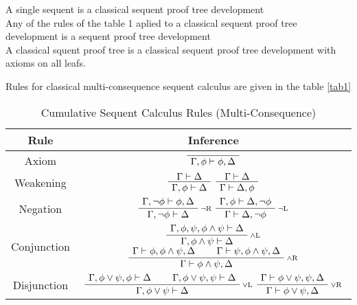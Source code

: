 \documentclass[runningheads]{llncs}
\begin{document}
\begin {definition}
    A single sequent is a classical sequent proof tree development\\
    Any of the rules of the table 1 aplied to a classical sequent proof tree development is a sequent proof tree development\\
    A classical squent proof tree is a classical sequent proof tree development with axioms on all leafs.
\end {definition} 

Rules for classical multi-consequence sequent calculus are given in the table \ref{tab1}

\begin{table}[h!]
    \caption{Cumulative Sequent Calculus Rules (Multi-Consequence)}\label{tab:cumulative}
    \centering
    \renewcommand{\arraystretch}{3}
    \begin{tabular}{|c|c|}
        \hline
        \textbf{Rule} & \textbf{Inference} \\ \hline
        Axiom & $\AxiomC{}\UnaryInfC{$\Gamma, \phi \vdash \phi, \Delta$}\DisplayProof$ \\ \hline
        
        Weakening & 
        $\AxiomC{$\Gamma \vdash \Delta$}\UnaryInfC{$\Gamma, \phi \vdash \Delta$}\DisplayProof$ \quad
        $\AxiomC{$\Gamma \vdash \Delta$}\UnaryInfC{$\Gamma \vdash \Delta, \phi$}\DisplayProof$ \\ \hline
        
        Negation & 
        $\RightLabel{\scriptsize{$\neg$R}}\AxiomC{$\Gamma , \neg \phi \vdash \phi, \Delta$}\UnaryInfC{$\Gamma, \neg \phi \vdash \Delta$}\DisplayProof$ \quad
        $\RightLabel{\scriptsize{$\neg$L}}\AxiomC{$\Gamma, \phi \vdash \Delta, \neg \phi $}\UnaryInfC{$\Gamma \vdash  \Delta, \neg \phi $}\DisplayProof$ \\ \hline
        
        Conjunction & 
        $\RightLabel{\scriptsize{$\land$L}}\AxiomC{$\Gamma, \phi, \psi, \phi \land \psi \vdash \Delta$}\UnaryInfC{$\Gamma, \phi \land \psi \vdash \Delta$}\DisplayProof$ \quad
        $\RightLabel{\scriptsize{$\land$R}}\AxiomC{$\Gamma \vdash \phi, \phi \land \psi,\Delta$}\AxiomC{$\Gamma \vdash \psi, \phi \land \psi,\Delta$}\BinaryInfC{$\Gamma \vdash \phi \land \psi, \Delta$}\DisplayProof$ \\ \hline
        
        Disjunction & 
        $\RightLabel{\scriptsize{$\lor$L}} \AxiomC{$\Gamma, \phi \lor \psi,\phi \vdash \Delta$}\AxiomC{$\Gamma, \phi \lor \psi,\psi \vdash \Delta$}\BinaryInfC{$\Gamma, \phi \lor \psi \vdash \Delta$}\DisplayProof$ \quad
        $\RightLabel{\scriptsize{$\lor$R}} \AxiomC{$\Gamma \vdash \phi \lor \psi, \psi, \Delta$}\UnaryInfC{$\Gamma \vdash \phi \lor \psi, \Delta$}\DisplayProof$ \\ \hline
        

\end{tabular}
\end{table}
\end{document}
